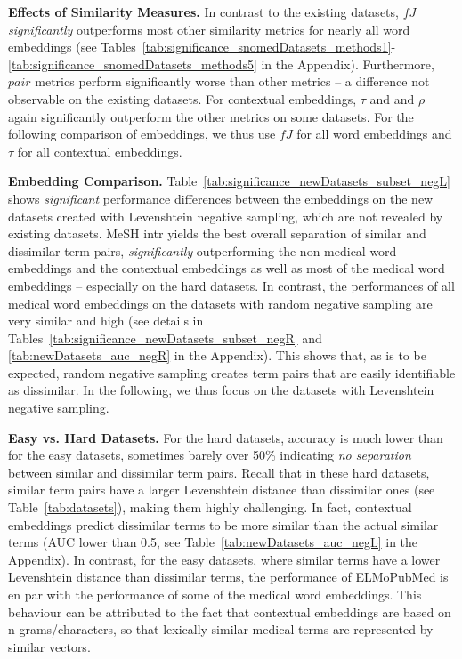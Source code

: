 \documentclass[letterpaper]{article} %
\begin{document}
\noindent\textbf{Effects of Similarity Measures.}
In contrast to the existing datasets, $fJ$ \emph{significantly} outperforms most other similarity metrics for nearly all word embeddings (see Tables~\ref{tab:significance_snomedDatasets_methods1}-\ref{tab:significance_snomedDatasets_methods5} in the Appendix).
Furthermore, $pair$ metrics perform significantly worse than other metrics -- a difference not observable on the existing datasets.
For contextual embeddings, $\tau$ and and $\rho$ again significantly outperform the other metrics on some datasets.
For the following comparison of embeddings, we thus use $fJ$ for all word embeddings and $\tau$ for all contextual embeddings.

\noindent\textbf{Embedding Comparison.}
Table~\ref{tab:significance_newDatasets_subset_negL} shows \emph{significant} performance differences between the embeddings on the new datasets created with Levenshtein negative sampling, which are not revealed by existing datasets.
MeSH intr yields the best overall separation of similar and dissimilar term pairs, \emph{significantly} outperforming the non-medical word embeddings and the contextual embeddings as well as most of the medical word embeddings -- especially on the hard datasets.
In contrast, the performances of all medical word embeddings on the datasets with random negative sampling are very similar and high (see details in Tables~\ref{tab:significance_newDatasets_subset_negR} and \ref{tab:newDatasets_auc_negR} in the Appendix). 
This shows that, as is to be expected, random negative sampling creates term pairs that are easily identifiable as dissimilar. 
In the following, we thus focus on the datasets with Levenshtein negative sampling.

\noindent\textbf{Easy vs. Hard Datasets.}
For the hard datasets, accuracy is much lower than for the easy datasets, sometimes barely over 50\% indicating \emph{no separation} between similar and dissimilar term pairs.
Recall that in these hard datasets, similar term pairs have a larger Levenshtein distance than dissimilar ones (see Table~\ref{tab:datasets}), making them highly challenging. 
In fact, contextual embeddings predict dissimilar terms to be more similar than the actual similar terms (AUC lower than 0.5, see Table~\ref{tab:newDatasets_auc_negL} in the Appendix).
In contrast, for the easy datasets, where similar terms have a lower Levenshtein distance than dissimilar terms, the performance of ELMoPubMed is en par with the performance of some of the medical word embeddings.
This behaviour can be attributed to the fact that contextual embeddings are based on n-grams/characters, so that lexically similar medical terms are represented by similar vectors.
\end{document}
